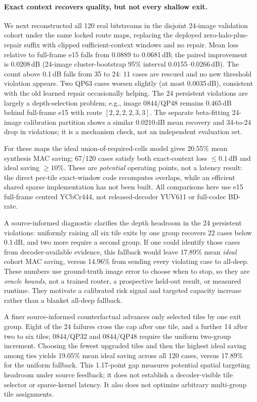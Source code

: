 \paragraph{Exact context recovers quality, but not every shallow exit.}
We next reconstructed all 120 real bitstreams in the disjoint 24-image
validation cohort under the same locked route maps, replacing the deployed
zero-halo-plus-repair suffix with clipped sufficient-context windows and no
repair. Mean loss relative to full-frame e15 falls from 0.0889 to
0.0681\,dB; the paired improvement is 0.0208\,dB (24-image cluster-bootstrap
95\% interval 0.0155--0.0266\,dB). The count above 0.1\,dB falls from
35 to 24: 11 cases are rescued and no new threshold violation appears.
Two QP63 cases worsen slightly (at most 0.0035\,dB), consistent with the
old learned repair occasionally helping. The 24 persistent violations
are largely a depth-selection problem; e.g., image 0844/QP48 remains
0.465\,dB behind full-frame e15 with route $[2,2,2,2,3,3]$.
The separate beta-fitting 24-image calibration partition shows a similar
0.0210\,dB mean recovery and 34-to-24 drop in violations; it is a mechanism
check, not an independent evaluation set.

For these maps the ideal union-of-required-cells model gives 20.55\%
mean synthesis MAC saving; 67/120 cases satisfy both exact-context loss
$\leq0.1$\,dB and ideal saving $\geq10$\%. These are \emph{potential}
operating points, not a latency result: the direct per-tile exact-window
code recomputes overlaps, while an efficient shared sparse implementation
has not been built. All comparisons here use e15 full-frame centred
YCbCr444, not released-decoder YUV611 or full-codec BD-rate.

A source-informed diagnostic clarifies the depth headroom in the 24
persistent violations: uniformly raising all six tile exits by one group
recovers 22 cases below 0.1\,dB, and two more require a second group.
If one could identify those cases from decoder-available evidence, this
fallback would leave 17.89\% mean \emph{ideal} cohort MAC saving, versus
14.96\% from sending every violating case to all-deep. These numbers use
ground-truth image error to choose when to stop, so they are \emph{oracle
bounds}, not a trained router, a prospective held-out result, or measured
runtime. They motivate a calibrated risk signal and targeted capacity
increase rather than a blanket all-deep fallback.

A finer source-informed counterfactual advances only selected tiles by one
exit group. Eight of the 24 failures cross the cap after one tile, and a
further 14 after two to six tiles; 0844/QP32 and 0844/QP48 require the
uniform two-group increment. Choosing the fewest upgraded tiles and then
the highest ideal saving among ties yields 19.05\% mean ideal saving across
all 120 cases, versus 17.89\% for the uniform fallback. This 1.17-point
gap measures potential spatial targeting headroom under source feedback;
it does not establish a decoder-visible tile selector or sparse-kernel
latency. It also does not optimize arbitrary multi-group tile assignments.


